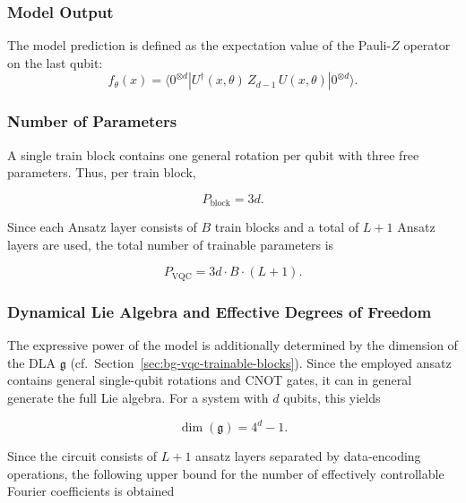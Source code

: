 \subsubsection{Model Output}

The model prediction is defined as the expectation value of the
Pauli-$Z$ operator on the last qubit:
\begin{equation}
f_\theta(x)
=
\langle 0^{\otimes d} |
U^\dagger(x,\theta)\,
Z_{d-1}\,
U(x,\theta)
| 0^{\otimes d} \rangle.
\end{equation}

\subsubsection{Number of Parameters}

A single train block contains one general rotation per qubit with three free parameters. Thus, per train block,

\begin{equation}
P_{\text{block}} = 3d.
\end{equation}

Since each Ansatz layer consists of $B$ train blocks and a total of $L+1$ Ansatz layers are used, the total number of trainable parameters is

\begin{equation}
\label{eq:params_vqc}
P_{\text{VQC}} = 3d \cdot B \cdot (L+1).
\end{equation}

\subsubsection{Dynamical Lie Algebra and Effective Degrees of Freedom}

The expressive power of the model is additionally determined by the dimension
of the DLA $\mathfrak{g}$
(cf.\ Section~\ref{sec:bg-vqc-trainable-blocks}).
Since the employed ansatz contains general single-qubit rotations and
CNOT gates, it can in general generate the full
Lie algebra. For a system with $d$
qubits, this yields

\begin{equation}
\dim(\mathfrak{g}) = 4^d - 1 .
\end{equation}

Since the circuit consists of $L+1$ ansatz layers separated by
data-encoding operations, the following upper bound
for the number of effectively controllable Fourier coefficients is obtained

